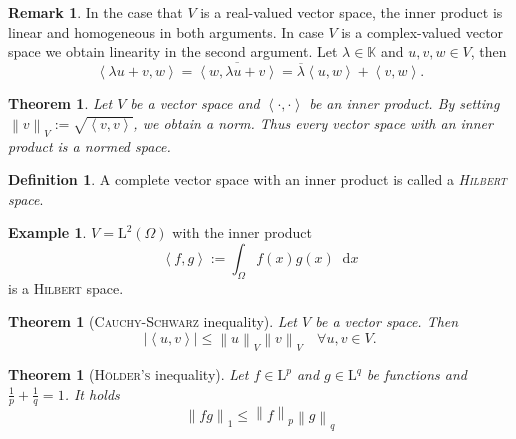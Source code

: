 \documentclass[12pt,a4paper,twoside, open=right]{scrreprt}
\theoremstyle{definition}
\newtheorem{rem}[auf]{Remark}
\newtheorem{defn}[auf]{Definition}
\newtheorem{bsp}[auf]{Example}
\theoremstyle{plain}
\newtheorem{sa}[auf]{Theorem}
\newcommand{\abs}[1]{\left\vert #1\right\vert}
\newcommand{\dotp}[2]{\left\langle #1,#2\right\rangle}
\newcommand{\kk}{\mathbb{K}}
\newcommand{\norm}[1]{\left\lVert#1\right\rVert}
\newcommand{\D}{\mathop{}\!\mathrm{d}}
\begin{document}
\begin{rem}
    In the case that $V$ is a real-valued vector space, the inner product is linear and homogeneous in both arguments. In case $V$ is a complex-valued vector space we obtain linearity in the second argument. Let $\lambda\in\kk$ and $u,v,w\in V$, then
    \begin{equation}
        \dotp{\lambda u +v}{w}=\overline{\dotp{w}{\lambda u + v}}=\overline{\lambda}\dotp{u}{w}+\dotp{v}{w}.
    \end{equation}
\end{rem}
\begin{sa}
    Let $V$ be a vector space and $\dotp{\cdot}{\cdot}$ be an inner product. By setting $\norm{v}_V:=\sqrt{\dotp{v}{v}}$, we obtain a norm. Thus every vector space with an inner product is a normed space.
\end{sa}
\begin{defn}
    A complete vector space with an inner product is called a \emph{\textsc{Hilbert} space}.
\end{defn}
\begin{bsp}
    $V=\mathrm{L}^2(\Omega)$ with the inner product
    \begin{equation}
    \dotp{f}{g}:=\int_\Omega f(x)g(x)\D x
    \end{equation}
    is a \textsc{Hilbert} space.
\end{bsp}
\begin{sa}[\textsc{Cauchy-Schwarz} inequality]
    \label{sa:Schwarz}
    Let $V$ be a vector space. Then 
    \begin{equation}
        \abs{\dotp{u}{v}}\le\norm{u}_V\norm{v}_V\quad \forall u,v\in V.
    \end{equation}
\end{sa}
\begin{sa}[\textsc{Hölder's} inequality]
    \label{sa:hoelder}
    Let $f\in \mathrm{L}^p$ and $g\in\mathrm{L}^q$ be functions and $\frac{1}{p}+\frac{1}{q}=1$. It holds
    \begin{equation}
        \norm{fg}_{1}\le\norm{f}_p\norm{g}_q
    \end{equation}
\end{sa}
\end{document}
